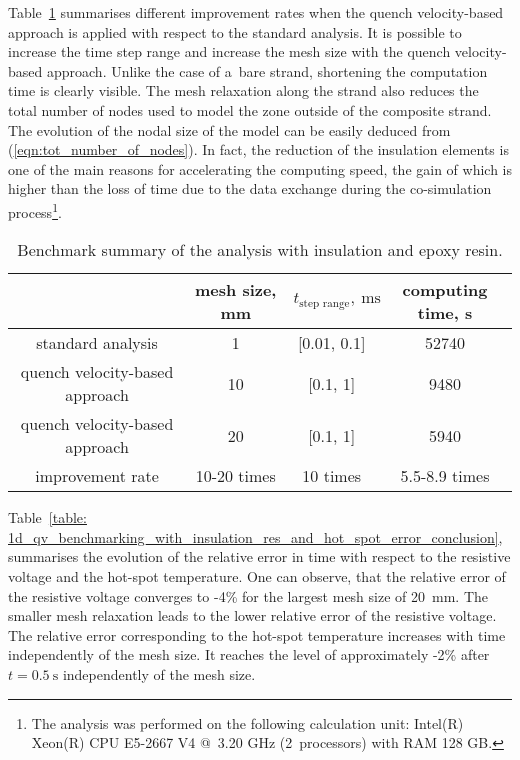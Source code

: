 
Table~\ref{table: 1d_qv_benchmarking_with_insulation_methods_comparison} summarises different improvement rates when the quench velocity-based approach is applied with respect to the standard analysis. It is possible to increase the time step range and increase the mesh size with the quench velocity-based approach. Unlike the case of a~bare strand, shortening the computation time is clearly visible. The mesh relaxation along the strand also reduces the total number of nodes used to model the zone outside of the composite strand. The evolution of the nodal size of the model can be easily deduced from (\ref{eqn:tot_number_of_nodes}). In fact, the reduction of the insulation elements is one of the main reasons for accelerating the computing speed, the gain of which is higher than the loss of time due to the data exchange during the co-simulation process\footnote{The analysis was performed on the following calculation unit: Intel(R) Xeon(R) CPU E5-2667 V4 @~3.20 GHz (2~processors) with RAM 128 GB.}.

\begin{table}[H]
    \caption{Benchmark summary of the analysis with insulation and epoxy resin.} 
    \vspace{-1.em} 
    \fontsize{10}{10}
    \selectfont 
    \renewcommand{\arraystretch}{1.5}
    \begin{center}
        \begin{tabular}{ cccc }  
        \hline
          & mesh size, mm & $t_\text{step range},~\text{ms}$ & computing time, s\\
        \hline
        standard analysis & 1 & [0.01, 0.1] & 52740 \\
        quench velocity-based approach & 10 & [0.1, 1] & 9480 \\
        quench velocity-based approach & 20 & [0.1, 1] & 5940 \\
        \hline 
        improvement rate & 10-20 times & 10 times & 5.5-8.9 times \\
        \end{tabular}
    \end{center}  
     \label{table: 1d_qv_benchmarking_with_insulation_methods_comparison} 
 \end{table}
 
Table~\ref{table: 1d_qv_benchmarking_with_insulation_res_and_hot_spot_error_conclusion}, summarises the evolution of the relative error in time with respect to the resistive voltage and the hot-spot temperature. One can observe, that the relative error of the resistive voltage converges to -4\% for the largest mesh size of 20~mm. The smaller mesh relaxation leads to the lower relative error of the resistive voltage. The relative error corresponding to the hot-spot temperature increases with time independently of the mesh size. It reaches the level of approximately -2\% after $t=0.5~\text{s}$ independently of the mesh size. 

